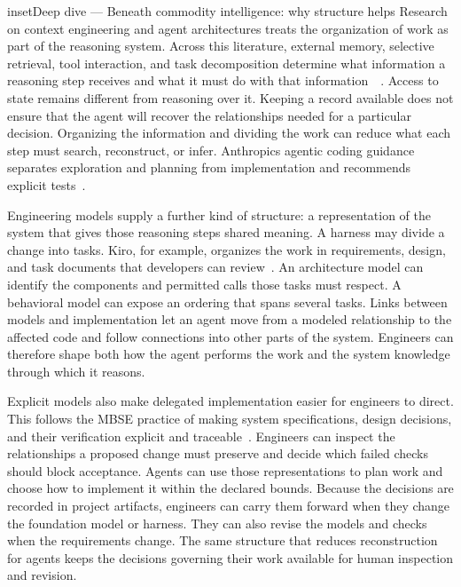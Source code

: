 \begin{bookbox}{inset}{Deep dive --- Beneath commodity intelligence: why structure helps}
\label{inset-beneath-commodity-intelligence}
Research on context engineering and agent architectures treats the organization of work as part of the reasoning system. Across this literature, external memory, selective retrieval, tool interaction, and task decomposition determine what information a reasoning step receives and what it must do with that information~\citep{mei2025contextengineering}~\citep{wang2024autonomousagents}. Access to state remains different from reasoning over it. Keeping a record available does not ensure that the agent will recover the relationships needed for a particular decision. Organizing the information and dividing the work can reduce what each step must search, reconstruct, or infer. Anthropic\textquotesingle s agentic coding guidance separates exploration and planning from implementation and recommends explicit tests~\citep{cherny2025agenticcoding}.

Engineering models supply a further kind of structure: a representation of the system that gives those reasoning steps shared meaning. A harness may divide a change into tasks. Kiro, for example, organizes the work in requirements, design, and task documents that developers can review~\citep{swaminathan2025kiro}. An architecture model can identify the components and permitted calls those tasks must respect. A behavioral model can expose an ordering that spans several tasks. Links between models and implementation let an agent move from a modeled relationship to the affected code and follow connections into other parts of the system. Engineers can therefore shape both how the agent performs the work and the system knowledge through which it reasons.

Explicit models also make delegated implementation easier for engineers to direct. This follows the MBSE practice of making system specifications, design decisions, and their verification explicit and traceable~\citep{madni2018mbse}. Engineers can inspect the relationships a proposed change must preserve and decide which failed checks should block acceptance. Agents can use those representations to plan work and choose how to implement it within the declared bounds. Because the decisions are recorded in project artifacts, engineers can carry them forward when they change the foundation model or harness. They can also revise the models and checks when the requirements change. The same structure that reduces reconstruction for agents keeps the decisions governing their work available for human inspection and revision.
\end{bookbox}
